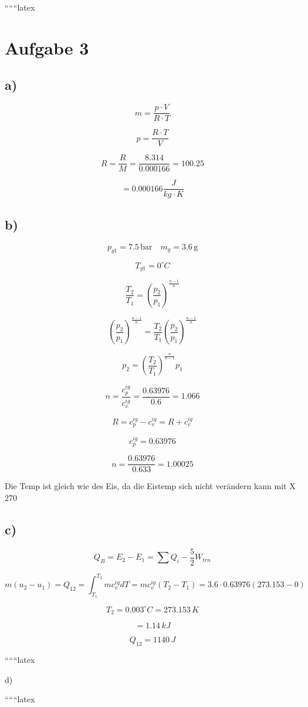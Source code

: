 
``````latex


\section*{Aufgabe 3}

\subsection*{a)}
\[
m = \frac{p \cdot V}{R \cdot T}
\]

\[
p = \frac{R \cdot T}{V}
\]

\[
R = \frac{R}{M} = \frac{8.314}{0.000166} = 100.25
\]

\[
= 0.000166 \frac{J}{kg \cdot K}
\]

\subsection*{b)}
\[
p_{g1} = 7.5 \, \text{bar} \quad m_{g} = 3.6 \, \text{g}
\]

\[
T_{g1} = 0^\circ C
\]

\[
\frac{T_2}{T_1} = \left( \frac{p_2}{p_1} \right)^{\frac{n-1}{n}}
\]

\[
\left( \frac{p_2}{p_1} \right)^{\frac{n-1}{n}} = \frac{T_2}{T_1} \left( \frac{p_2}{p_1} \right)^{\frac{n-1}{n}}
\]

\[
p_2 = \left( \frac{T_2}{T_1} \right)^{\frac{n}{n-1}} p_1
\]

\[
n = \frac{c_p^{ig}}{c_v^{ig}} = \frac{0.63976}{0.6} = 1.066
\]

\[
R = c_p^{ig} - c_v^{ig} = R + c_v^{ig}
\]

\[
c_p^{ig} = 0.63976
\]

\[
n = \frac{0.63976}{0.633} = 1.00025
\]

Die Temp ist gleich wie des Eis, da die Eistemp sich nicht verändern kann mit X 270

\subsection*{c)}
\[
Q_B = E_2 - E_1 = \sum Q_i - \frac{5}{2} W_{trn}
\]

\[
m (u_2 - u_1) = Q_{12} = \int_{T_1}^{T_2} m c_v^{ig} dT = m c_v^{ig} (T_2 - T_1) = 3.6 \cdot 0.63976 (273.153 - 0)
\]

\[
T_2 = 0.003^\circ C = 273.153 \, K
\]

\[
= 1.14 \, kJ
\]

\[
Q_{12} = 1140 \, J
\]

``````latex


d)

``````latex


